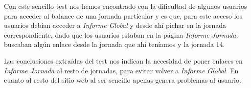 Con este sencillo test nos hemos encontrado con la dificultad de algunos usuarios para acceder al balance de una jornada particular y es que, para este acceso los usuarios debían acceder a \textit{Informe Global} y desde ahí pichar en la jornada correspondiente, dado que los usuarios estaban en la página \textit{Informe Jornada}, buscaban algún enlace desde la jornada que ahí teníamos y la jornada 14.

Las conclusiones extraídas del test nos indican la necesidad de poner enlaces en \textit{Informe Jornada} al resto de jornadas, para evitar volver a \textit{Informe Global}. En cuanto al resto del sitio web al ser sencillo apenas genera problemas al usuario.

